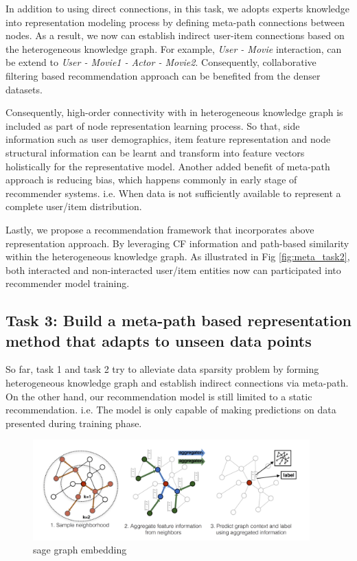 In addition to using direct connections, in this task, we adopts experts knowledge into representation modeling process by defining meta-path connections between nodes. As a result, we now can establish indirect user-item connections based on the heterogeneous knowledge graph. For example, \textit{User - Movie} interaction, can be extend to \textit{User - Movie1 - Actor - Movie2}. Consequently, collaborative filtering based recommendation approach can be benefited from the denser datasets.

Consequently, high-order connectivity with in heterogeneous knowledge graph is included as part of node representation learning process. So that, side information such as user demographics, item feature representation and node structural information can be learnt and transform into feature vectors holistically for the representative model.
Another added benefit of meta-path approach is reducing bias, which happens commonly in early stage of recommender systems. i.e. When data is not sufficiently available to represent a complete user/item distribution.

Lastly, we propose a recommendation framework that incorporates above representation approach. By leveraging CF information and path-based similarity within the heterogeneous knowledge graph. As illustrated in Fig \ref{fig:meta_task2}, both interacted and non-interacted user/item entities now can participated into recommender model training.

\subsection*{Task 3: Build a meta-path based representation method that adapts to unseen data points}

So far, task 1 and task 2 try to alleviate data sparsity problem by forming heterogeneous knowledge graph and establish indirect connections via meta-path. On the other hand, our recommendation model is still limited to a static recommendation. i.e. The model is only capable of making predictions on data presented during training phase.

\begin{figure}[!h]
    \centering
    \includegraphics[width=0.95\textwidth]{figs/sagegraph.png}
    \caption{sage graph embedding}\label{fig:sagegraph}
\end{figure}

